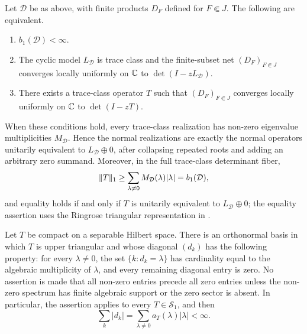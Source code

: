 \begin{theorem}
  \label{thm:cyclic-fredholm-realization}
  Let \(\mathcal D\) be as above, with finite products \(D_F\) defined for
  \(F\Subset J\).
  The following are equivalent.
  \begin{enumerate}[label=\textup{(\roman*)}]
    \item \(b_1(\mathcal D)<\infty\).
    \item The cyclic model \(L_{\mathcal D}\) is trace class and
    the finite-subset net \((D_F)_{F\Subset J}\) converges locally uniformly on
    \(\mathbb{C}\) to \(\det(I-zL_{\mathcal D})\).
    \item There exists a trace-class operator \(T\) such that
    \((D_F)_{F\Subset J}\) converges locally uniformly on \(\mathbb{C}\) to
    \(\det(I-zT)\).
  \end{enumerate}
  When these conditions hold, every trace-class realization has non-zero
  eigenvalue multiplicities \(M_{\mathcal D}\).  Hence the normal realizations
  are exactly the normal operators unitarily equivalent to
  \(L_{\mathcal D}\oplus0\), after collapsing repeated roots and adding an
  arbitrary zero summand.  Moreover, in the full trace-class determinant fiber,
  \[
    \|T\|_1\ge \sum_{\lambda\ne0}M_{\mathcal D}(\lambda)\lvert \lambda \rvert
    =b_1(\mathcal D),
  \]
  and equality holds if and only if \(T\) is unitarily equivalent to
  \(L_{\mathcal D}\oplus0\); the equality assertion uses the
  Ringrose triangular representation in
  .
\end{theorem}

\begin{lemma}
  \label{lem:ordered-ringrose-triangular-representation}
  Let \(T\) be compact on a separable Hilbert space. There is an orthonormal
  basis in which \(T\) is upper triangular and whose diagonal \((d_k)\) has the
  following property: for every \(\lambda\ne0\), the set
  \(\{k:d_k=\lambda\}\) has cardinality equal to the algebraic multiplicity of
  \(\lambda\), and every remaining diagonal entry is zero. No assertion is made
  that all non-zero entries precede all zero entries unless the non-zero
  spectrum has finite algebraic support or the zero sector is absent. In
  particular, the assertion applies to every \(T\in\mathcal S_1\), and then
  \[
    \sum_k |d_k|=
    \sum_{\lambda\ne0}a_T(\lambda)|\lambda|<\infty .
  \]
\end{lemma}

